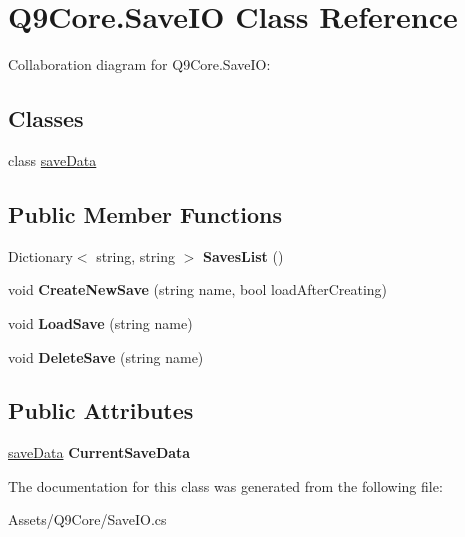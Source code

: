 \hypertarget{class_q9_core_1_1_save_i_o}{}\section{Q9\+Core.\+Save\+IO Class Reference}
\label{class_q9_core_1_1_save_i_o}


Collaboration diagram for Q9\+Core.\+Save\+IO\+:
\subsection*{Classes}
\begin{DoxyCompactItemize}
\item 
class \mbox{\hyperlink{class_q9_core_1_1_save_i_o_1_1save_data}{save\+Data}}
\end{DoxyCompactItemize}
\subsection*{Public Member Functions}
\begin{DoxyCompactItemize}
\item 
\mbox{\label{class_q9_core_1_1_save_i_o_a2ca65e94cf6a22f2c62df59b09434a0e}} 
Dictionary$<$ string, string $>$ {\bfseries Saves\+List} ()
\item 
\mbox{\label{class_q9_core_1_1_save_i_o_aff31850872576273448cecd9a7298ff7}} 
void {\bfseries Create\+New\+Save} (string name, bool load\+After\+Creating)
\item 
\mbox{\label{class_q9_core_1_1_save_i_o_a3bd4c7148e500d1b2a99870395bb9c35}} 
void {\bfseries Load\+Save} (string name)
\item 
\mbox{\label{class_q9_core_1_1_save_i_o_a492931aefcd939097190dfa9d1747ac0}} 
void {\bfseries Delete\+Save} (string name)
\end{DoxyCompactItemize}
\subsection*{Public Attributes}
\begin{DoxyCompactItemize}
\item 
\mbox{\label{class_q9_core_1_1_save_i_o_a594400b9f115c6de71e125bc25b0254b}} 
\mbox{\hyperlink{class_q9_core_1_1_save_i_o_1_1save_data}{save\+Data}} {\bfseries Current\+Save\+Data}
\end{DoxyCompactItemize}


The documentation for this class was generated from the following file\+:\begin{DoxyCompactItemize}
\item 
Assets/\+Q9\+Core/Save\+I\+O.\+cs\end{DoxyCompactItemize}
